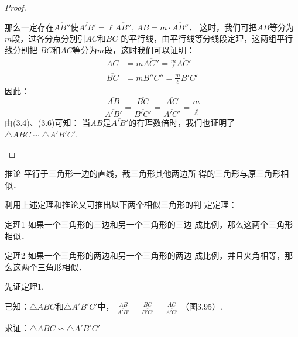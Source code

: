 \begin{proof}
\begin{enumerate}
那么一定存在$\overline{AB''}$使$\overline{A'B'}=\ell \overline{AB''}$, $\overline{AB}=m\cdot \overline{AB''}$．
这时，我们可把$\overline{AB}$等分为$m$段，过各分点分别引$AC$和$BC$
的平行线，由平行线等分线段定理，这两组平行线分别把
$\overline{BC}$和$\overline{AC}$等分为$m$段，这时我们可以证明：
\[\begin{split}
    \overline{AC}&=m\overline{AC''}=\frac{m}{\ell}\overline{AC'}\\
    \overline{BC}&=m\overline{B''C''}=\frac{m}{\ell}\overline{B'C'}
\end{split}\]
因此：
\begin{equation}
    \frac{\overline{AB}}{\overline{A'B'}}=\frac{\overline{BC}}{\overline{B'C'}}=\frac{\overline{AC}}{\overline{A'C'}}=\frac{m}{\ell}
\end{equation}
由(3.4)、(3.6)可知：
当$\overline{AB}$是$\overline{A'B'}$的有理数倍时，我们也证明了
$\triangle ABC\backsim \triangle A'B'C'$.
\end{enumerate}
\end{proof}

\begin{blk}
    {推论} 平行于三角形一边的直线，截三角形其他两边所
得的三角形与原三角形相似．
\end{blk}

利用上述定理和推论又可推出以下两个相似三角形的判
定定理：

\begin{blk}
    {定理1}
如果一个三角形的三边和另一个三角形的三边
成比例，那么这两个三角形相似．
\end{blk}

\begin{blk}
    {定理2}
如果一个三角形的两边和另一个三角形的两边
成比例，并且夹角相等，那么这两个三角形相似．
\end{blk}

先证定理1.

已知：$\triangle ABC$和$\triangle A'B'C'$中，
$\frac{\overline{AB}}{\overline{A'B'}}=\frac{\overline{BC}}{\overline{B'C'}}=\frac{\overline{AC}}{\overline{A'C'}}$
（图3.95）.

求证：$\triangle ABC\backsim \triangle A'B'C'$

\begin{figure}[htp]
    \centering
{}
    \caption{}
\end{figure}

